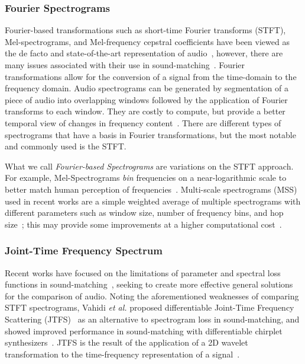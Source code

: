 \documentclass[lettersize,journal]{IEEEtran}
\providecommand{\gls}[1]{#1}
\begin{document}
\subsubsection{Fourier Spectrograms}
\label{sec:fourier_specs}
Fourier-based transformations such as short-time Fourier transforms (\gls{STFT}), Mel-spectrograms, and Mel-frequency cepstral coefficients have been viewed as the de facto and state-of-the-art representation of audio~\cite{beauchamp2003error,mitchell2007evolutionary,yee2018automatic}, however, there are many issues associated with their use in sound-matching~\cite{turian2020sorry,vahidi2023mesostructures,han2023perceptual,uzrad2024diffmoog}. Fourier transformations allow for the conversion of a signal from the time-domain to the frequency domain. Audio spectrograms can be generated by segmentation of a piece of audio into overlapping windows followed by the application of Fourier transforms to each window. They are costly to compute, but provide a better temporal view of changes in frequency content~\cite{muller2007dynamic,smith2007mathematics}. There are different types of spectrograms that have a basis in Fourier transformations, but the most notable and commonly used is the STFT.  

What we call \textit{Fourier-based Spectrograms} are variations on the STFT approach. For example, Mel-Spectrograms \textit{bin} frequencies on a near-logarithmic scale to better match human perception of frequencies~\cite{muller2007dynamic}. Multi-scale spectrograms (\gls{MSS}) used in recent works are a simple weighted average of multiple spectrograms with different parameters such as window size, number of frequency bins, and hop size~\cite{engel2020ddsp,vahidi2023mesostructures}; this may provide some improvements at a higher computational cost~\cite{turian2020sorry,engel2020ddsp}.


\subsubsection{Joint-Time Frequency Spectrum}
Recent works have focused on the limitations of parameter and spectral loss functions in sound-matching~\cite{vahidi2023mesostructures,uzrad2024diffmoog}, seeking to create more effective general solutions for the comparison of audio. 
Noting the aforementioned weaknesses of comparing STFT spectrograms, Vahidi \textit{et al.} proposed differentiable Joint-Time Frequency Scattering (\gls{JTFS})~\cite{anden2015joint} as an alternative to spectrogram loss in sound-matching, and showed improved performance in sound-matching with differentiable chirplet synthesizers~\cite{vahidi2023mesostructures}.  JTFS is the result of the application of a 2D wavelet transformation to the time-frequency representation of a signal~\cite{anden2015joint}. 
\end{document}
